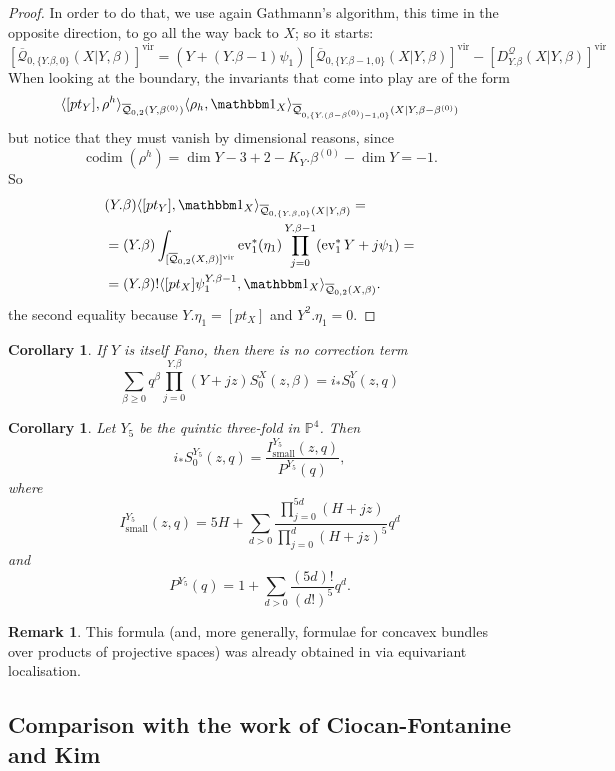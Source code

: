 \documentclass[11pt]{amsart}
\newcommand{\Q}[4]{\overline{\mathcal Q}_{#1,#2}(#3,#4)}
\newcommand{\PP}{\mathbb P}
\newcommand{\ev}{\operatorname{ev}}
\newcommand{\codim}{\operatorname{codim}}
\theoremstyle{plain}
\newtheorem{cor}[thm]{Corollary}
\theoremstyle{definition}
\newtheorem{remark}[thm]{Remark}
\begin{document}
\begin{proof}
In order to do that, we use again Gathmann's algorithm, this time in the opposite direction, to go all the way back to $X$; so it starts:
\[
 [\Q{0}{\{Y.\beta,0\}}{X|Y}{\beta}]^\text{vir}=(Y+(Y.\beta-1)\psi_1)[\Q{0}{\{Y.\beta-1,0\}}{X|Y}{\beta}]^\text{vir}-[D_{Y.\beta}^{\mathcal Q}(X|Y,\beta)]^\text{vir}
\]
When looking at the boundary, the invariants that come into play are of the form
\[
 \langle [pt_Y],\rho^h\rangle_{\Q{0}{2}{Y}{\beta^{(0)}}}\langle \rho_h,\mathbbm 1_{X}\rangle_{\Q{0}{\{Y.(\beta-\beta^{(0)})-1,0\}}{X|Y}{\beta-\beta^{(0)}}}
\]
but notice that they must vanish by dimensional reasons, since
\[
 \codim(\rho^h)=\dim Y-3+2-K_Y.\beta^{(0)}-\dim Y=-1.
\]
So
\begin{align*}
 & (Y.\beta)\langle [pt_Y],\mathbbm 1_{X}\rangle_{\Q{0}{\{Y.\beta,0\}}{X|Y}{\beta}} = \\
 & = (Y.\beta)\int_{[\Q{0}{2}{X}{\beta}]^{\text{vir}}}\ev_1^*(\eta_1)\prod_{j=0}^{Y.\beta-1}(\ev_1^*Y+j\psi_1) = \\
 & = (Y.\beta)!\langle[pt_X]\psi_1^{Y.\beta-1},\mathbbm 1_X\rangle_{\Q{0}{2}{X}{\beta}}.
\end{align*}
the second equality because $Y.\eta_1=[pt_X]$ and $Y^2.\eta_1=0$.
\end{proof}

\begin{cor}
 If $Y$ is itself Fano, then there is no correction term
 \[
  \sum_{\beta\geq 0} q^\beta\prod_{j=0}^{Y.\beta}(Y+jz)S_0^X(z,\beta) = i_*S_0^Y(z,q)
 \]
\end{cor}

\begin{cor}
 Let $Y_5$ be the quintic three-fold in $\PP^4$. Then
 \[
  i_*S_0^{Y_5}(z,q)=\frac{I_{\text{small}}^{Y_5}(z,q)}{P^{Y_5}(q)},
 \]
where
\[
 I_{\text{small}}^{Y_5}(z,q)=5H+\sum_{d>0}\frac{\prod_{j=0}^{5d}(H+jz)}{\prod_{j=0}^{d}(H+jz)^5}q^d
\]
and
\[
 P^{Y_5}(q)=1+\sum_{d>0}\frac{(5d)!}{(d!)^5}q^d.
\]
\end{cor}

\begin{remark}
 This formula (and, more generally, formulae for concavex bundles over products of projective spaces) was already obtained in \cite[Theorem 1]{CZ-mirror} via equivariant localisation.
\end{remark}

\subsection{Comparison with the work of Ciocan-Fontanine and Kim}
\end{document}
